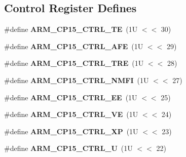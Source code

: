 \subsection*{Control Register Defines}
\begin{DoxyCompactItemize}
\item 
\mbox{\label{group__RTEMSScoreCPUARMCP15_ga555d93ba04030d058a429b7172e697f4}} 
\#define {\bfseries A\+R\+M\+\_\+\+C\+P15\+\_\+\+C\+T\+R\+L\+\_\+\+TE}~(1\+U $<$$<$ 30)
\item 
\mbox{\label{group__RTEMSScoreCPUARMCP15_ga2e47c445aec78ccd936c729c2fe4dd96}} 
\#define {\bfseries A\+R\+M\+\_\+\+C\+P15\+\_\+\+C\+T\+R\+L\+\_\+\+A\+FE}~(1\+U $<$$<$ 29)
\item 
\mbox{\label{group__RTEMSScoreCPUARMCP15_gaef07da19696e54c2760f6831b7969f91}} 
\#define {\bfseries A\+R\+M\+\_\+\+C\+P15\+\_\+\+C\+T\+R\+L\+\_\+\+T\+RE}~(1\+U $<$$<$ 28)
\item 
\mbox{\label{group__RTEMSScoreCPUARMCP15_gaedb3477c4ea72939ee860782d8df729c}} 
\#define {\bfseries A\+R\+M\+\_\+\+C\+P15\+\_\+\+C\+T\+R\+L\+\_\+\+N\+M\+FI}~(1\+U $<$$<$ 27)
\item 
\mbox{\label{group__RTEMSScoreCPUARMCP15_gabdd9cffe795e5390978fb30acbaf0bc4}} 
\#define {\bfseries A\+R\+M\+\_\+\+C\+P15\+\_\+\+C\+T\+R\+L\+\_\+\+EE}~(1\+U $<$$<$ 25)
\item 
\mbox{\label{group__RTEMSScoreCPUARMCP15_gae9159dca5943229bd24dc8e964b28145}} 
\#define {\bfseries A\+R\+M\+\_\+\+C\+P15\+\_\+\+C\+T\+R\+L\+\_\+\+VE}~(1\+U $<$$<$ 24)
\item 
\mbox{\label{group__RTEMSScoreCPUARMCP15_gaf1e4be77e02f0f2900e3fd33a8059db4}} 
\#define {\bfseries A\+R\+M\+\_\+\+C\+P15\+\_\+\+C\+T\+R\+L\+\_\+\+XP}~(1\+U $<$$<$ 23)
\item 
\mbox{\label{group__RTEMSScoreCPUARMCP15_gaf88cc04091ff7c50f16b7efd2eadacc6}} 
\#define {\bfseries A\+R\+M\+\_\+\+C\+P15\+\_\+\+C\+T\+R\+L\+\_\+U}~(1\+U $<$$<$ 22)
\item 

\end{DoxyCompactItemize}
